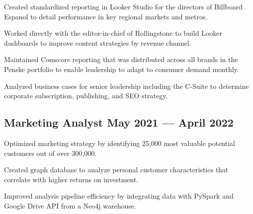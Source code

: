 \documentclass[%
               doublesided,
               paper=a4,
               fontsize=10.5pt
              ]{my-resume}
\begin{document}
{\begin{zitemize}
        \item{Created standardized reporting in Looker Studio for the directors of Billboard Espanol to detail performance in key regional markets and metros.}
        \item{Worked directly with the editor-in-chief of Rollingstone to build Looker dashboards to improve content strategies by revenue channel.}
        \item{Maintained Comscore reporting that was distributed across all brands in the Penske portfolio to enable leadership to adapt to consumer demand monthly.}
        \item{Analyzed business cases for senior leadership including the C-Suite to determine corporate subscription, publishing, and SEO strategy.}
    \end{zitemize}

    \subsection{{Marketing Analyst  \hfill May 2021 --- April 2022}}
    \begin{zitemize}
        \footnotesize
        \item{Optimized marketing strategy by identifying 25,000 most valuable potential customers out of over 300,000.}
        \item{Created graph database to analyze personal customer characteristics that correlate with higher returns on investment.}
        \item{Improved analysis pipeline efficiency by integrating data with PySpark and Google Drive API from a Neo4j warehouse.}
        

\end{zitemize}}
\end{document}
